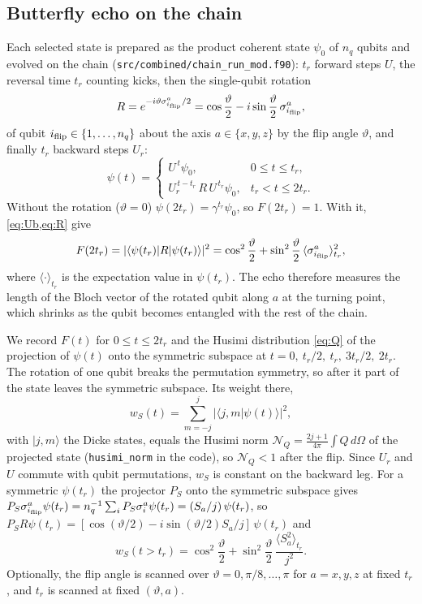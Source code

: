 \documentclass[aps,pra,twocolumn,superscriptaddress,nofootinbib]{revtex4-2}
\newcommand{\nq}{n_q}                      %
\newcommand{\tr}{t_r}                      %
\newcommand{\fa}{\vartheta}                %
\newcommand{\iflip}{i_{\rm flip}}          %
\newcommand{\wS}{w_S}                      %
\newcommand{\NQ}{\mathcal N_Q}             %
\newcommand{\Ub}{U_r}                      %
\newcommand{\Uc}{U}                        %
\newcommand{\Rf}{R}                        %
\begin{document}
\subsection{Butterfly echo on the chain}\label{sec:echo}

Each selected state is prepared as the product coherent state $\psi_0$ of $\nq$ qubits and evolved on the chain
(\texttt{src/combined/chain\_run\_mod.f90}): $\tr$ forward steps $\Uc$, the reversal time $\tr$ counting kicks,
then the single-qubit rotation
\begin{equation}\label{eq:R}
  \Rf = e^{-i\fa\sigma^a_{\iflip}/2} = \cos\frac{\fa}{2} - i\sin\frac{\fa}{2}\,\sigma^a_{\iflip},
\end{equation}
of qubit $\iflip\in\{1,\dots,\nq\}$ about the axis $a\in\{x,y,z\}$ by the flip angle $\fa$, and finally $\tr$ backward
steps $\Ub$:
\begin{equation}\label{eq:protocol}
  \psi(t) = \begin{cases} \Uc^{\,t}\psi_0, & 0\le t\le\tr,\\
  \Ub^{\,t-\tr}\,\Rf\,\Uc^{\,\tr}\psi_0, & \tr<t\le2\tr. \end{cases}
\end{equation}
Without the rotation ($\fa=0$) $\psi(2\tr)=\gamma^{\tr}\psi_0$, so $F(2\tr)=1$. With it, \cref{eq:Ub,eq:R} give
\begin{equation}\label{eq:Fecho}
  F(2\tr) = |\langle\psi(\tr)|\Rf|\psi(\tr)\rangle|^2
  = \cos^2\frac{\fa}{2} + \sin^2\frac{\fa}{2}\,\langle\sigma^a_{\iflip}\rangle_{\tr}^2 ,
\end{equation}
where $\langle\cdot\rangle_{\tr}$ is the expectation value in $\psi(\tr)$. The echo therefore measures the length of
the Bloch vector of the rotated qubit along $a$ at the turning point, which shrinks as the qubit becomes entangled with
the rest of the chain.

We record $F(t)$ for $0\le t\le2\tr$ and the Husimi distribution \cref{eq:Q} of the projection of $\psi(t)$ onto the
symmetric subspace at $t=0,\ \tr/2,\ \tr,\ 3\tr/2,\ 2\tr$. The rotation of one qubit breaks the permutation symmetry,
so after it part of the state leaves the symmetric subspace. Its weight there,
\begin{equation}\label{eq:wS}
  \wS(t) = \sum_{m=-j}^{j}|\langle j,m|\psi(t)\rangle|^2 ,
\end{equation}
with $|j,m\rangle$ the Dicke states, equals the Husimi norm $\NQ=\frac{2j+1}{4\pi}\int Q\,d\Omega$ of the projected
state (\texttt{husimi\_norm} in the code), so $\NQ<1$ after the flip. Since $\Ub$ and $\Uc$ commute with qubit
permutations, $\wS$ is constant on the backward leg. For a symmetric $\psi(\tr)$ the projector $P_S$ onto the symmetric subspace gives
$P_S\sigma^a_{\iflip}\psi(\tr)=\nq^{-1}\sum_iP_S\sigma^a_i\psi(\tr)=(S_a/j)\,\psi(\tr)$, so
$P_S\Rf\psi(\tr)=[\cos(\fa/2)-i\sin(\fa/2)S_a/j]\,\psi(\tr)$ and
\begin{equation}\label{eq:wSpred}
  \wS(t>\tr) = \cos^2\frac{\fa}{2} + \sin^2\frac{\fa}{2}\,\frac{\langle S_a^2\rangle_{\tr}}{j^2}.
\end{equation}
Optionally, the flip angle is scanned over $\fa=0,\pi/8,\dots,\pi$ for $a=x,y,z$ at fixed $\tr$, and $\tr$ is scanned
at fixed $(\fa,a)$.
\end{document}
